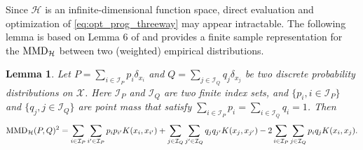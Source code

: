 \documentclass[12pt]{article}
\newtheorem{lemma}{Lemma}
\begin{document}
Since $\mathcal{H}$ is an infinite-dimensional function space, direct evaluation and optimization of \eqref{eq:opt_prog_threeway} may appear intractable. The following lemma is based on Lemma 6 of \citet{gretton2012kernel} and provides a finite sample representation for the $\textnormal{MMD}_\mathcal{H}$ between two (weighted) empirical distributions.
\begin{lemma}
	\label{lem:mmd_finite}
	Let $P = \sum_{i \in \mathcal{I}_P} p_i \delta_{x_i}$ and $Q = \sum_{j \in \mathcal{I}_Q} q_j \delta_{x_j}$ be two discrete probability distributions on $\mathcal{X}$. Here $\mathcal{I}_P$ and $\mathcal{I}_Q$ are two finite index sets, and $\{p_i, i \in \mathcal{I}_P\}$ and $\{q_j, j \in \mathcal{I}_Q\}$ are point mass that satisfy $\sum_{i \in \mathcal{I}_P} p_i = \sum_{i \in \mathcal{I}_Q} q_i = 1$. Then
	\begin{align*}
		\textnormal{MMD}_\mathcal{H}(P, Q)^2 = 
		\sum_{i \in \mathcal{I}_P} \sum_{i' \in \mathcal{I}_P} p_i p_{i'} K(x_i, x_{i'}) + 
		\sum_{j \in \mathcal{I}_Q} \sum_{j' \in \mathcal{I}_Q} q_j q_{j'} K(x_j, x_{j'}) -
		2\sum_{i \in \mathcal{I}_P} \sum_{j \in \mathcal{I}_Q} p_i q_j K(x_i, x_j)
		.\end{align*}
\end{lemma}
\end{document}

